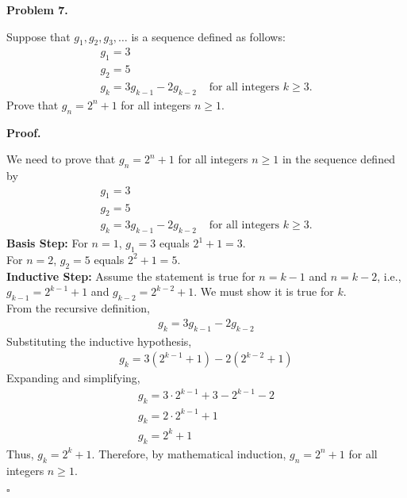 \documentclass{article}
\newenvironment{problem}[1]{
    \begin{mdframed}[backgroundcolor=gray!20, skipabove=\baselineskip, skipbelow=\baselineskip, nobreak=true, innerleftmargin=10pt, innerrightmargin=10pt, innertopmargin=10pt, innerbottommargin=10pt]
    \textbf{Problem #1.}
}{
    \end{mdframed}
}
\newenvironment{proof}{
    \begin{mdframed}[nobreak=false, innerleftmargin=10pt, innerrightmargin=10pt, innertopmargin=10pt, innerbottommargin=10pt]
    \textbf{Proof.}
}{
    \hfill $\square$
    \end{mdframed}
}
\begin{document}
    \begin{problem}{7}
        Suppose that $g_1, g_2, g_3, \ldots$ is a sequence defined as follows:
        \begin{align*}
            g_1 = 3 \\
            g_2 = 5 \\
            g_k = 3g_{k-1} - 2g_{k-2} & \text{ for all integers } k \geq 3.
        \end{align*}
        Prove that $g_n = 2^n + 1$ for all integers $n \geq 1$.
    \end{problem}
    \begin{proof}
        We need to prove that $g_n = 2^n + 1$ for all integers $n \geq 1$ in the sequence defined by
        \begin{align*}
            g_1 = 3 \\
            g_2 = 5 \\
            g_k = 3g_{k-1} - 2g_{k-2} & \text{ for all integers } k \geq 3.
        \end{align*}
        \textbf{Basis Step:}
        For $n = 1$, $g_1 = 3$ equals $2^1 + 1 = 3$. \\
        For $n = 2$, $g_2 = 5$ equals $2^2 + 1 = 5$. \\
        \textbf{Inductive Step:}
        Assume the statement is true for $n = k-1$ and $n = k-2$, i.e., $g_{k-1} = 2^{k-1} + 1$ and $g_{k-2} = 2^{k-2} + 1$. We must show it is true for $k$. \\
        From the recursive definition,
        \begin{align*}
            g_k = 3g_{k-1} - 2g_{k-2}
        \end{align*}
        Substituting the inductive hypothesis,
        \begin{align*}
            g_k = 3(2^{k-1} + 1) - 2(2^{k-2} + 1)
        \end{align*}
        Expanding and simplifying,
        \begin{align*}
            g_k = 3 \cdot 2^{k-1} + 3 - 2^{k-1} - 2 \\
            g_k = 2 \cdot 2^{k-1} + 1 \\
            g_k = 2^k + 1
        \end{align*}
        Thus, $g_k = 2^k + 1$.
        Therefore, by mathematical induction, $g_n = 2^n + 1$ for all integers $n \geq 1$.
    \end{proof}
\end{document}
